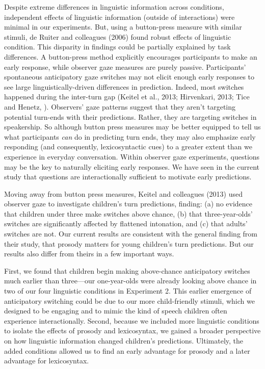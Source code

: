 \documentclass[authoryear, 12pt]{elsarticle}
\begin{document}
Despite extreme differences in linguistic information across conditions, independent effects of linguistic information (outside of interactions) were minimal in our experiments. But, using a button-press measure with similar stimuli, de Ruiter and colleagues (2006) found robust effects of linguistic condition. This disparity in findings could be partially explained by task differences. A button-press method explicitly encourages participants to make an early response, while observer gaze measures are purely passive. Participants' spontaneous anticipatory gaze switches may not elicit enough early responses to see large linguistically-driven differences in prediction. Indeed, most switches happened during the inter-turn gap (Keitel et al., 2013; Hirvenkari, 2013; Tice and Henetz, \citeyear{TiceHenetz11}). Observers' gaze patterns suggest that they aren't targeting potential turn-ends with their predictions. Rather, they are targeting switches in speakership. So although button press measures may be better equipped to tell us what participants \textit{can} do in predicting turn ends, they may also emphasize early responding (and consequently, lexicosyntactic cues) to a greater extent than we experience in everyday conversation. Within observer gaze experiments, questions may be the key to naturally eliciting early responses. We have seen in the current study that questions are interactionally sufficient to motivate early predictions.

Moving away from button press measures, Keitel and colleagues (2013) used observer gaze to investigate children's turn predictions, finding: (a) no evidence that children under three make switches above chance, (b) that three-year-olds' switches are significantly affected by flattened intonation, and (c) that adults' switches are not. Our current results are consistent with the general finding from their study, that prosody matters for young children's turn predictions. But our results also differ from theirs in a few important ways. 

First, we found that children begin making above-chance anticipatory switches much earlier than three---our one-year-olds were already looking above chance in two of our four linguistic conditions in Experiment 2. This earlier emergence of anticipatory switching could be due to our more child-friendly stimuli, which we designed to be engaging and to mimic the kind of speech children often experience interactionally. Second, because we included more linguistic conditions to isolate the effects of prosody and lexicosyntax, we gained a broader perspective on how linguistic information changed children's predictions. Ultimately, the added conditions allowed us to find an early advantage for prosody and a later advantage for lexicosyntax.
\end{document}
